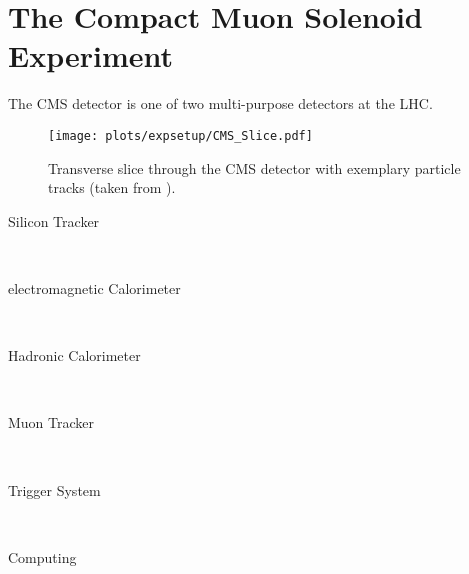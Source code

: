 \section{The Compact Muon Solenoid Experiment}
The CMS detector is one of two multi-purpose detectors at the LHC.
\begin{figure}
	\centering
	\texttt{[image: plots/expsetup/CMS\_Slice.pdf]}
	\caption[Transverse slice through the CMS detector]{Transverse slice through the CMS detector with exemplary particle tracks (taken from \cite{cms_slice}).}
	\label{fig:expsetup:cms_slice}
\end{figure}
\begin{description}
\item[Silicon Tracker] \hfill \\
\item[electromagnetic Calorimeter] \hfill \\
\item[Hadronic Calorimeter] \hfill \\
\item[Muon Tracker] \hfill \\
\item[Trigger System] \hfill \\
\item[Computing] \hfill \\
\end{description}